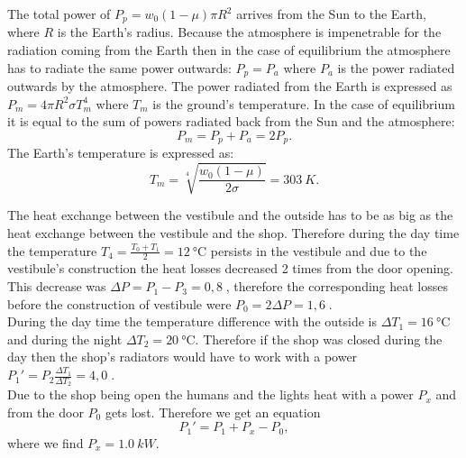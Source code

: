 \documentclass[11pt]{article}
\begin{document}

\solueng
The total power of $P_p=w_0 \left(1-\mu\right)\pi R^2$ arrives from the Sun to the Earth, where $R$ is the Earth’s radius. Because the atmosphere is impenetrable for the radiation coming from the Earth then in the case of equilibrium the atmosphere has to radiate the same power outwards: $P_p=P_a$ where $P_a$ is the power radiated outwards by the atmosphere. The power radiated from the Earth is expressed as $P_m=4 \pi R^2 \sigma T_m^4$ where $T_m$ is the ground’s temperature. In the case of equilibrium it is equal to the sum of powers radiated back from the Sun and the atmosphere:
\[P_m=P_p+P_a=2P_p.\]
The Earth’s temperature is expressed as:
\[T_m=\sqrt[4]{\frac{w_0\left(1-\mu\right)}{2\sigma}}=\SI{303}{K}.\]
\probend
\bigskip


\solueng
The heat exchange between the vestibule and the outside has to be as big as the heat exchange between the vestibule and the shop. Therefore during the day time the temperature $T_4=\frac{T_0+T_1}{2}=\SI{12}{\degreeCelsius}$ persists in the vestibule and due to the vestibule’s construction the heat losses decreased 2 times from the door opening. This decrease was $\Delta P=P_1-P_3=0,8\;$, therefore the corresponding heat losses before the construction of vestibule were $P_0=2\Delta P=1,6\;$. \\
During the day time the temperature difference with the outside is $\Delta T_1=\SI{16}{\degreeCelsius}$ and during the night $\Delta T_2=\SI{20}{\degreeCelsius}$. Therefore if the shop was closed during the day then the shop’s radiators would have to work with a power $P_1'=P_2\frac{\Delta T_1}{\Delta T_2}=4,0\;$.\\
Due to the shop being open the humans and the lights heat with a power $P_x$ and from the door $P_0$ gets lost. Therefore we get an equation
\[
P_1'=P_1+P_x-P_0,
\]
where we find $P_x=\SI{1,0}{kW}$.
\probend
\bigskip

\end{document}
